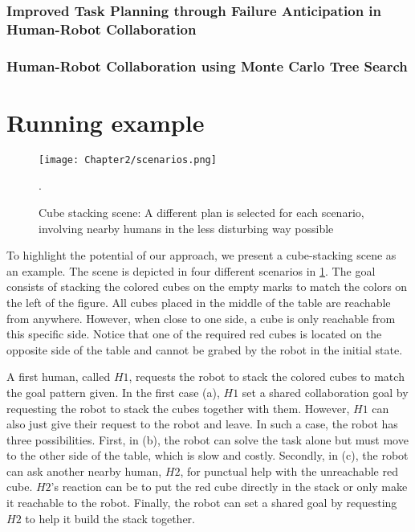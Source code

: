 \subsubsection{Improved Task Planning through Failure Anticipation in Human-Robot Collaboration}
\label{w11}

\label{w12}
\subsubsection{Human-Robot Collaboration using Monte Carlo Tree Search}


\section{Running example}

\begin{figure}
    \centering
    \texttt{[image: Chapter2/scenarios.png]}
    \caption{Cube stacking scene: A different plan is selected for each scenario, involving nearby humans in the less disturbing way possible}.
    \label{fig:scenarios}
\end{figure}

To highlight the potential of our approach, we present a cube-stacking scene as an example. The scene is depicted in four different scenarios in \ref{fig:scenarios}. The goal consists of stacking the colored cubes on the empty marks to match the colors on the left of the figure. All cubes placed in the middle of the table are reachable from anywhere. However, when close to one side, a cube is only reachable from this specific side. Notice that one of the required red cubes is located on the opposite side of the table and cannot be grabed by the robot in the initial state.

A first human, called $H1$, requests the robot to stack the colored cubes to match the goal pattern given. In the first case (a), $H1$ set a shared collaboration goal by requesting the robot to stack the cubes together with them. However, $H1$ can also just give their request to the robot and leave. In such a case, the robot has three possibilities. First, in (b), the robot can solve the task alone but must move to the other side of the table, which is slow and costly. Secondly, in (c), the robot can ask another nearby human, $H2$, for punctual help with the unreachable red cube. $H2$'s reaction can be to put the red cube directly in the stack or only make it reachable to the robot. Finally, the robot can set a shared goal by requesting $H2$ to help it build the stack together. 

